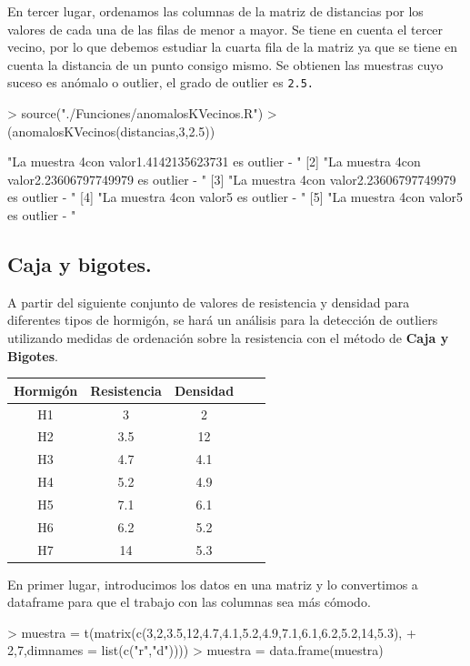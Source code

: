 \documentclass [a4paper] {article}
\begin{document}
\bigskip
En tercer lugar, ordenamos las columnas de la matriz de distancias por los valores de cada una de
las filas de menor a mayor. Se tiene en cuenta el tercer vecino, por lo que debemos estudiar la cuarta 
fila de la matriz ya que se tiene en cuenta la distancia de un punto consigo mismo. Se obtienen las 
muestras cuyo suceso es anómalo o outlier, el grado de outlier es \texttt{2.5.}
\begin{Schunk}
\begin{Sinput}
> source("./Funciones/anomalosKVecinos.R")
> (anomalosKVecinos(distancias,3,2.5))
\end{Sinput}
\begin{Soutput}
[1] "La muestra 4con valor1.4142135623731 es outlier - " 
[2] "La muestra 4con valor2.23606797749979 es outlier - "
[3] "La muestra 4con valor2.23606797749979 es outlier - "
[4] "La muestra 4con valor5 es outlier - "               
[5] "La muestra 4con valor5 es outlier - "               
\end{Soutput}
\end{Schunk}

\subsection{Caja y bigotes.}
\bigskip
A partir del siguiente conjunto de valores de resistencia y densidad para diferentes tipos de hormigón,
se hará un análisis para la detección de outliers utilizando medidas de ordenación sobre la resistencia
con el método de \textbf{Caja y Bigotes}.

\begin{table}[H]
\begin{center}
\begin{tabular}{|c|c|c|c|c|}
\hline
Hormigón & Resistencia & Densidad\\
\hline \hline
H1 & 3 & 2 \\ \hline
H2 & 3.5 & 12 \\ \hline
H3 & 4.7 & 4.1 \\ \hline
H4 & 5.2 & 4.9 \\ \hline
H5 & 7.1 & 6.1 \\ \hline
H6 & 6.2 & 5.2 \\ \hline
H7 & 14 & 5.3 \\ \hline
\end{tabular}
\end{center}
\end{table}

\bigskip
En primer lugar, introducimos los datos en una matriz y lo convertimos a dataframe para que el trabajo con las 
columnas sea más cómodo.
\begin{Schunk}
\begin{Sinput}
> muestra = t(matrix(c(3,2,3.5,12,4.7,4.1,5.2,4.9,7.1,6.1,6.2,5.2,14,5.3),
+         2,7,dimnames = list(c("r","d"))))
> muestra = data.frame(muestra)
\end{Sinput}
\end{Schunk}
\end{document}

